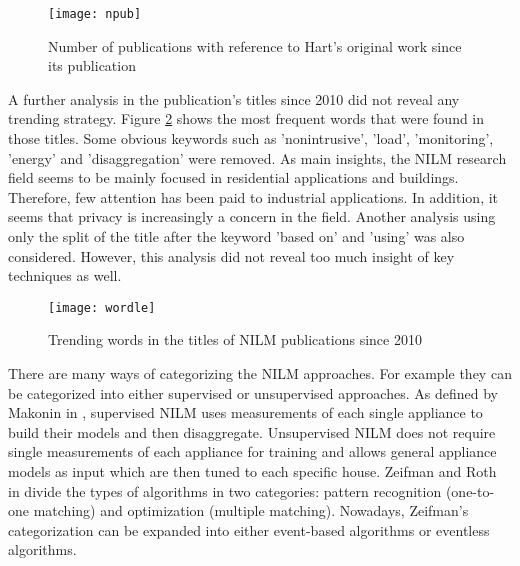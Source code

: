 \begin{figure}[bt]
    \centering
    \texttt{[image: npub]}
    \caption{Number of publications with reference to Hart's original work since its publication}
    \label{1npub}
\end{figure}


A further analysis in the publication's titles since 2010 did not reveal any trending strategy. Figure \ref{wordle} shows the most frequent words that were found in those titles. Some obvious keywords such as 'nonintrusive', 'load', 'monitoring', 'energy' and 'disaggregation' were removed. As main insights, the NILM research field seems to be mainly focused in residential applications and buildings. Therefore, few attention has been paid to industrial applications. In addition, it seems that privacy is increasingly a concern in the field. Another analysis using only the split of the title after the keyword 'based on' and 'using' was also considered. However, this analysis did not reveal too much insight of key techniques as well. 

\begin{figure}[bt]
    \centering
    \texttt{[image: wordle]}
    \caption{Trending words in the titles of NILM publications since 2010}
    \label{wordle}
\end{figure}

There are many ways of categorizing the NILM approaches. For example they can be categorized into either supervised or unsupervised approaches. As defined by Makonin in \cite{makonin2016}, supervised NILM uses measurements of each single appliance to build their models and then disaggregate. Unsupervised NILM does not require single measurements of each appliance for training and allows general appliance models as input which are then tuned to each specific house. Zeifman and Roth in \cite{zeifman} divide the types of algorithms in two categories: pattern recognition (one-to-one matching) and optimization (multiple matching). Nowadays, Zeifman's categorization can be expanded into either event-based algorithms or eventless algorithms. 

